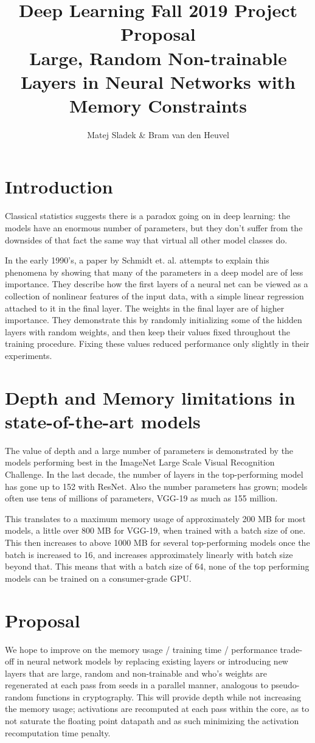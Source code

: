 \documentclass[]{article}
\title{Deep Learning Fall 2019 Project Proposal\\\large{Large, Random Non-trainable Layers in Neural Networks with Memory Constraints}}
\author{Matej Sladek \& Bram van den Heuvel}
\begin{document}
\maketitle

\section{Introduction}
Classical statistics suggests there is a paradox going on in deep learning: the models have an enormous number of parameters, but they don't suffer from the downsides of that fact the same way that virtual all other model classes do.

In the early 1990's, a paper by Schmidt et. al. attempts to explain this phenomena by showing that many of the parameters in a deep model are of less importance. They describe how the first layers of a neural net can be viewed as a collection of nonlinear features of the input data, with a simple linear regression attached to it in the final layer. The weights in the final layer are of higher importance. They demonstrate this by randomly initializing some of the hidden layers with random weights, and then keep their values fixed throughout the training procedure. Fixing these values reduced performance only slightly in their experiments.


\section{Depth and Memory limitations in state-of-the-art models}
The value of depth and a large number of parameters is demonstrated by the models performing best in the ImageNet Large Scale Visual Recognition Challenge. In the last decade, the number of layers in the top-performing model has gone up to 152 with ResNet. Also the number parameters has grown; models often use tens of millions of parameters, VGG-19 as much as 155 million.

This translates to a maximum memory usage of approximately 200 MB for most models, a little over 800 MB for VGG-19, when trained with a batch size of one. This then increases to above 1000 MB for several top-performing models once the batch is increased to 16, and increases approximately linearly with batch size beyond that. This means that with a batch size of 64, none of the top performing models can be trained on a consumer-grade GPU.

\section{Proposal}
We hope to improve on the memory usage / training time / performance trade-off in neural network models by replacing existing layers or introducing new layers that are large, random and non-trainable and who's weights are regenerated at each pass from seeds in a parallel manner, analogous to pseudo-random functions in cryptography. This will provide depth while not increasing the memory usage; activations are recomputed at each pass within the core, as to not saturate the floating point datapath and as such minimizing the activation recomputation time penalty.
\end{document}
